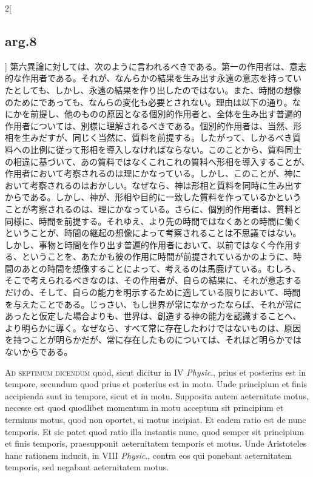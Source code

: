 \documentclass[paper=a4paper,fontsize=10pt,jafontsize=9pt,titlepage]{jlreq}
\begin{document}
\begin{paracol}{2}[\subsection{arg.8}]
第六異論に対しては、次のように言われるべきである。第一の作用者は、意志
的な作用者である。それが、なんらかの結果を生み出す永遠の意志を持ってい
たとしても、しかし、永遠の結果を作り出したのではない。また、時間の想像
のためにであっても、なんらの変化も必要とされない。理由は以下の通り。な
にかを前提し、他のものの原因となる個別的作用者と、全体を生み出す普遍的
作用者については、別様に理解されるべきである。個別的作用者は、当然、形
相を生みだすが、同じく当然に、質料を前提する。したがって、しかるべき質
料への比例に従って形相を導入しなければならない。このことから、質料同士
の相違に基づいて、あの質料ではなくこれこれの質料へ形相を導入することが、
作用者において考察されるのは理にかなっている。しかし、このことが、神に
おいて考察されるのはおかしい。なぜなら、神は形相と質料を同時に生み出す
からである。しかし、神が、形相や目的に一致した質料を作っているかという
ことが考察されるのは、理にかなっている。さらに、個別的作用者は、質料と
同様に、時間を前提する。それゆえ、より先の時間ではなくあとの時間に働く
ということが、時間の継起の想像によって考察されることは不思議ではない。
しかし、事物と時間を作り出す普遍的作用者において、以前ではなく今作用す
る、ということを、あたかも彼の作用に時間が前提されているかのように、時
間のあとの時間を想像することによって、考えるのは馬鹿げている。むしろ、
そこで考えられるべきなのは、その作用者が、自らの結果に、それが意志する
だけの、そして、自らの能力を明示するために適している限りにおいて、時間
を与えたことである。じっさい、もし世界が常になかったならば、それが常に
あったと仮定した場合よりも、世界は、創造する神の能力を認識することへ、
より明らかに導く。なぜなら、すべて常に存在したわけではないものは、原因
を持つことが明らかだが、常に存在したものについては、それほど明らかでは
ないからである。


\switchcolumn*[\subsection{ad.7}]


{\scshape Ad septimum dicendum} quod, sicut dicitur in IV {\itshape Physic}., prius et
 posterius est in tempore, secundum quod prius et posterius est in
 motu. Unde principium et finis accipienda sunt in tempore, sicut et in
 motu. Supposita autem aeternitate motus, necesse est quod quodlibet
 momentum in motu acceptum sit principium et terminus motus, quod non
 oportet, si motus incipiat. Et eadem ratio est de nunc temporis. Et sic
 patet quod ratio illa instantis nunc, quod semper sit principium et
 finis temporis, praesupponit aeternitatem temporis et motus. Unde
 Aristoteles hanc rationem inducit, in VIII {\itshape Physic}., contra eos qui
 ponebant aeternitatem temporis, sed negabant aeternitatem motus.



\end{paracol}
\end{document}

